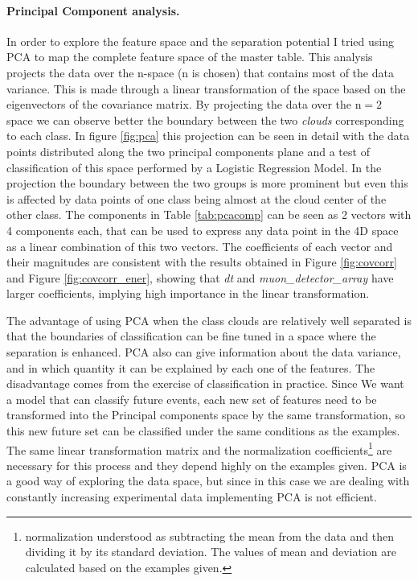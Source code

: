 \documentclass{article}
\begin{document}
\paragraph{Principal Component analysis.} In order to explore the feature space and the separation potential I tried using PCA to map the complete feature space of the master table. This analysis projects the data over the n-space (n is chosen) that contains most of the data variance. This is made through a linear transformation of the space based on the eigenvectors of the covariance matrix. By projecting the data over the n$=2$ space we can observe better the boundary between the two \textit{clouds} corresponding to each class. In figure \ref{fig:pca} this projection can be seen in detail with the data points distributed along the two principal components plane and a test of classification of this space performed by a Logistic Regression Model. In the projection the boundary between the two groups is more prominent but even this is affected by data points of one class being almost at the cloud center of the other class. The components in Table \ref{tab:pcacomp} can be seen as 2 vectors with 4 components each, that can be used to express any data point in the 4D space as a linear combination of this two vectors. The coefficients of each vector and their magnitudes are consistent with the results obtained in Figure \ref{fig:covcorr}  and Figure \ref{fig:covcorr_ener}, showing that \emph{dt} and \emph{muon\_detector\_array} have larger coefficients, implying high importance in the linear transformation.




The advantage of using PCA when the class clouds are relatively well separated is that the boundaries of classification can be fine tuned in a space where the separation is enhanced. PCA also can give information about the data variance, and in which quantity it can be explained by each one of the features. The disadvantage comes from the exercise of classification in practice. Since We want a model that can classify future events, each new set of features need to be transformed into the Principal components space by the same transformation, so this new future set can be classified under the same conditions as the examples. The same linear transformation matrix and the normalization coefficients\footnote{normalization understood as subtracting the mean from the data  and then dividing it by its standard deviation. The values of mean and deviation are calculated based on the examples given.} are necessary for this process and they depend highly on the examples given. PCA is a good way of exploring the data space, but since in this case  we are dealing with constantly increasing experimental data implementing PCA is not efficient.
\end{document}
